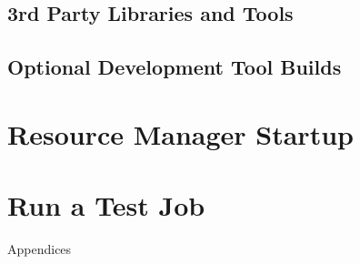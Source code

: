 \documentclass[letterpaper]{article}
\begin{document}
\subsection{3rd Party Libraries and Tools} \label{sec:3rdparty}






\subsection{Optional Development Tool Builds} \label{sec:3rdparty_intel}


\clearpage
\section{Resource Manager Startup} \label{sec:rms_startup}


\section{Run a Test Job} \label{sec:test_job}


\clearpage
\appendix
{\bf \LARGE \centerline{Appendices}} \vspace*{0.2cm}

\renewcommand{\thesubsection}{\Alph{subsection}}







\end{document}
